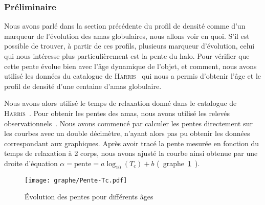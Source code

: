 			\subsubsection{Préliminaire}
				Nous avons parlé dans la section précédente du profil de densité
				comme d'un marqueur de l'évolution des amas globulaires, nous allons
				voir en quoi.
				S'il est possible de trouver, à partir de ces profils, plusieurs
				marqueur d'évolution, celui qui nous intéresse plus particulièrement
				est la pente du halo. Pour vérifier que cette pente évolue bien avec
				l'âge dynamique de l'objet, et comment, nous avons utilisé les
				données du catalogue de \textsc{Harris}~\cite{Harris} qui nous a
				permis d'obtenir l'âge et le profil de densité d'une centaine d'amas
				globulaire.
				
				Nous avons alors utilisé le temps de relaxation donné dans le catalogue de \textsc{Harris}~\cite{Harris}.
				Pour obtenir les pentes des amas, nous avons utilisé les relevés observationnels~\cite{Trager-graphe}. %
				Nous avons commencé par calculer les pentes directement sur les courbes avec un double décimètre, n'ayant alors pas pu obtenir les données correspondant aux graphiques.
				Après avoir tracé la pente mesurée en fonction du temps de relaxation à 2 corps, nous avons ajusté la
				courbe ainsi obtenue par une droite d'équation $ \alpha = \mathrm{pente} = a \log_{10}(T_c) + b$ (~graphe~\ref{Pente-lin}~).
				\begin{figure}[hbt!]
					\centering \texttt{[image: graphe/Pente-Tc.pdf]}
					\caption{Évolution des pentes pour différents âges}
					\label{Pente-lin}
				\end{figure}


